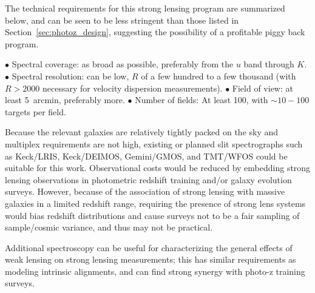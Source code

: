 The technical requirements for this strong lensing program are
summarized below, and can be seen to be less stringent than those listed
in Section~\ref{sec:photoz_design}, suggesting the possibility of a
profitable piggy back program.  

$\bullet$ Spectral coverage: as broad as possible, preferably from the $u$ band
through $K$.
$\bullet$ Spectral resolution: can be low, $R$ of a few hundred to a few
thousand (with $R>2000$ necessary for velocity dispersion measurements).
$\bullet$ Field of view: at least 5~arcmin, preferably more.
$\bullet$ Number of fields: At least 100, with $\sim10-100$ targets per field.

Because the relevant galaxies are relatively tightly packed on the sky and multiplex requirements are not high, existing or planned slit spectrographs such as Keck/LRIS, Keck/DEIMOS, Gemini/GMOS, and TMT/WFOS could be suitable for this work.  Observational costs would be reduced by embedding strong lensing observations in photometric redshift training and/or galaxy evolution surveys.  However, because of the association of strong lensing with massive galaxies in a limited redshift range, requiring the presence of strong lens systems would bias redshift distributions and cause surveys not to be a fair sampling of sample/cosmic variance, and thus may not be practical.

Additional spectroscopy can be useful for characterizing the general effects of weak lensing on  strong lensing measurements; this has similar
requirements as modeling intrinsic alignments, and can find strong
synergy with photo-z training surveys.

%



